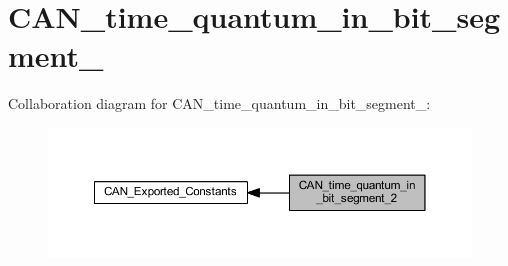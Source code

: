 \hypertarget{group___c_a_n__time__quantum__in__bit__segment__2}{}\section{C\+A\+N\+\_\+time\+\_\+quantum\+\_\+in\+\_\+bit\+\_\+segment\+\_}
\label{group___c_a_n__time__quantum__in__bit__segment__2}
Collaboration diagram for C\+A\+N\+\_\+time\+\_\+quantum\+\_\+in\+\_\+bit\+\_\+segment\+\_\+:
\nopagebreak
\begin{figure}[H]
\begin{center}
\leavevmode
\includegraphics[width=350pt]{group___c_a_n__time__quantum__in__bit__segment__2}
\end{center}
\end{figure}
